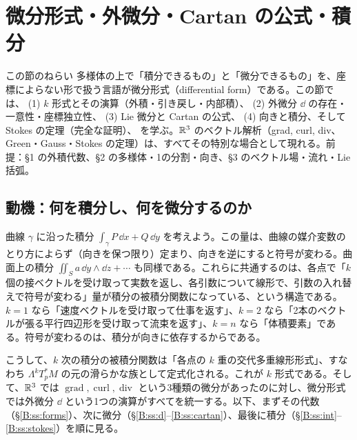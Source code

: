 \setcounter{section}{3}
\providecommand{\Bvol}{\mathrm{vol}}
\providecommand{\Bgrad}{\operatorname{grad}}
\providecommand{\Bcurl}{\operatorname{curl}}
\providecommand{\Bdiv}{\operatorname{div}}
\providecommand{\Bsgn}{\operatorname{sgn}}
\providecommand{\Bhat}[1]{\widehat{#1}}
\providecommand{\Bdeg}{\operatorname{deg}}
\providecommand{\Bkeep}[1]{\par\vskip 0pt plus #1\baselineskip\penalty-200\vskip 0pt plus -#1\baselineskip}%

\section{微分形式・外微分・Cartan の公式・積分}\label{B:sec4}

\begin{goalbox}{この節のねらい}
多様体の上で「積分できるもの」と「微分できるもの」を、座標によらない形で扱う言語が微分形式（differential form）である。この節では、
(1) $k$ 形式とその演算（外積・引き戻し・内部積）、
(2) 外微分 $\dd$ の存在・一意性・座標独立性、
(3) Lie 微分と Cartan の公式、
(4) 向きと積分、そして Stokes の定理（完全な証明）、
を学ぶ。$\mathbb R^3$ のベクトル解析（grad, curl, div、Green・Gauss・Stokes の定理）は、すべてその特別な場合として現れる。前提：§1 の外積代数、§2 の多様体・1の分割・向き、§3 のベクトル場・流れ・Lie 括弧。
\end{goalbox}

\subsection{動機：何を積分し、何を微分するのか}

曲線 $\gamma$ に沿った積分 $\int_\gamma P\,\dd x+Q\,\dd y$ を考えよう。この量は、曲線の媒介変数のとり方によらず（向きを保つ限り）定まり、向きを逆にすると符号が変わる。曲面上の積分 $\iint_S a\,\dd y\wedge\dd z+\cdots$ も同様である。これらに共通するのは、各点で「$k$ 個の接ベクトルを受け取って実数を返し、各引数について線形で、引数の入れ替えで符号が変わる」量が積分の被積分関数になっている、という構造である。$k=1$ なら「速度ベクトルを受け取って仕事を返す」、$k=2$ なら「2本のベクトルが張る平行四辺形を受け取って流束を返す」、$k=n$ なら「体積要素」である。符号が変わるのは、積分が向きに依存するからである。

こうして、$k$ 次の積分の被積分関数は「各点の $k$ 重の交代多重線形形式」、すなわち $\Lambda^kT^*_pM$ の元の滑らかな族として定式化される。これが $k$ 形式である。そして、$\mathbb R^3$ では $\Bgrad,\Bcurl,\Bdiv$ という3種類の微分があったのに対し、微分形式では外微分 $\dd$ という1つの演算がすべてを統一する。以下、まずその代数（\S\ref{B:ss:forms}）、次に微分（\S\ref{B:ss:d}--\ref{B:ss:cartan}）、最後に積分（\S\ref{B:ss:int}--\ref{B:ss:stokes}）を順に見る。

